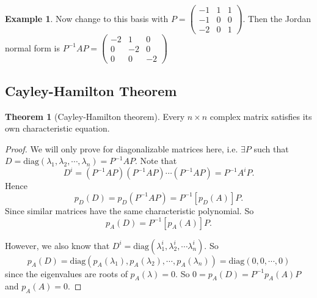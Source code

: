 \documentclass[a4paper]{article}
\theoremstyle{definition}
\newtheorem*{thm}{Theorem}
\newtheorem*{eg}{Example}
\begin{document}
\begin{eg}
  Now change to this basis with 
  $P = \begin{pmatrix}
    -1 & 1 & 1\\
    -1 & 0 & 0\\
    -2 & 0 & 1
  \end{pmatrix}$. Then the Jordan normal form is $P^{-1}AP = 
  \begin{pmatrix}
    -2 & 1 & 0\\
    0 & -2 & 0\\
    0 & 0 & -2
  \end{pmatrix}$
\end{eg}

\subsection{Cayley-Hamilton Theorem}
\begin{thm}[Cayley-Hamilton theorem]
  Every $n\times n$ complex matrix satisfies its own characteristic equation.
\end{thm}

\begin{proof}
  We will only prove for diagonalizable matrices here, i.e. $\exists P$ such that $D = \mathrm{diag}(\lambda_1, \lambda_2, \cdots, \lambda_n) = P^{-1}AP$.
Note that
\[
D^i = (P^{-1}AP)(P^{-1}AP)\cdots(P^{-1}AP) = P^{-1}A^iP.
\]
Hence
\[
p_D(D) = p_D(P^{-1}AP) = P^{-1}[p_D(A)]P.
\]
Since similar matrices have the same characteristic polynomial. So
\[
p_A(D) = P^{-1}[p_A(A)]P.
\]

However, we also know that $D^i = \mathrm{diag}(\lambda_1^i, \lambda_2^i, \cdots \lambda_n^i)$. So
\[
p_A(D) = \mathrm{diag}(p_A(\lambda_1), p_A(\lambda_2), \cdots, p_A(\lambda_n)) = \mathrm{diag}(0, 0, \cdots, 0)
\]
since the eigenvalues are roots of $p_A(\lambda) = 0$. So $0 = p_A(D) = P^{-1}p_A(A)P$ and $p_A(A) = 0$.
\end{proof}
\end{document}
